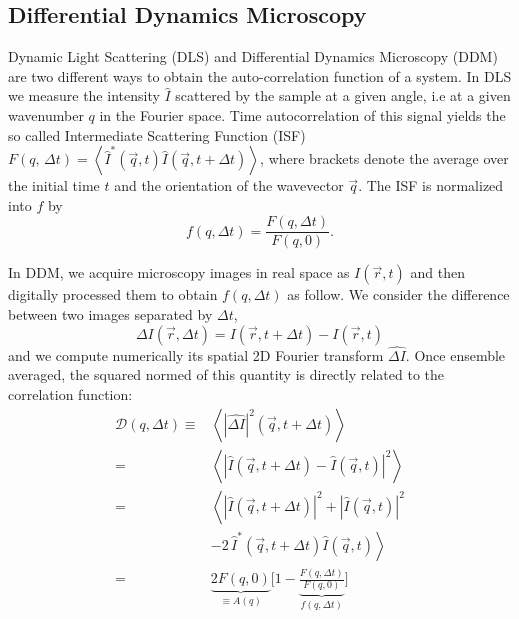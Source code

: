 \documentclass[%
 aip,
 jmp,%
 amsmath,amssymb,
reprint,%
]{revtex4-1}
\begin{document}
\subsection{Differential Dynamics Microscopy}

Dynamic Light Scattering (DLS) and Differential Dynamics Microscopy (DDM) are two different ways to obtain the auto-correlation function of a system. In DLS we measure the intensity $\hat{I}$ scattered by the sample at a given angle, i.e at a given wavenumber $q$ in the Fourier space. Time autocorrelation of this signal yields the so called Intermediate Scattering Function (ISF)~\citep{19_goodman2005introduction} $F(q, \, \Delta t) = \left\langle \hat{I}^*(\vec{q}, t) \hat{I}(\vec{q}, t+\Delta t) \right\rangle$, where brackets denote the average over the initial time $t$ and the orientation of the wavevector $\vec{q}$. The ISF is normalized into $f$ by
\begin{equation}
f(q, \Delta t) = \frac{F(q, \Delta t)}{F(q, 0)}.
\end{equation}



In DDM, we acquire microscopy images in real space as $I(\vec{r}, t)$ and then digitally processed them to obtain $f(q, \Delta t)$ as follow. We consider the difference between two images separated by $\Delta t$,
\begin{equation}
\Delta I(\vec{r},\Delta t) = I(\vec{r}, t+\Delta t) - I(\vec{r}, t)
\end{equation}
and we compute numerically its spatial 2D Fourier transform $\widehat{\Delta I}$. Once ensemble averaged, the squared normed of this quantity is directly related to the correlation function:
\begin{align*}
\mathcal{D}(q,\Delta t) \equiv& \left\langle \left|\widehat{\Delta I}\right|^2(\vec{q},t+\Delta t) \right\rangle\\
 =& \left\langle \left|\widehat{I}(\vec{q},t+\Delta t) - \widehat{I}(\vec{q},t)\right|^2 \right\rangle \\
=& \left\langle \left|\widehat{I}(\vec{q},t+ \Delta t)\right|^2 + \left|\widehat{I}(\vec{q},t)\right|^2\right. \\
&\left.- 2 \, \widehat{I}^*(\vec{q},t+\Delta t) \widehat{I}(\vec{q},t) \right\rangle\\
=& \underbrace{2F(q, 0)}_{\equiv A(q)} \bigg[ 1-\underbrace{\frac{F(q, \Delta t)}{F(q, 0)}}_{f(q, \Delta t)} \bigg]\\
\end{align*}
\end{document}
